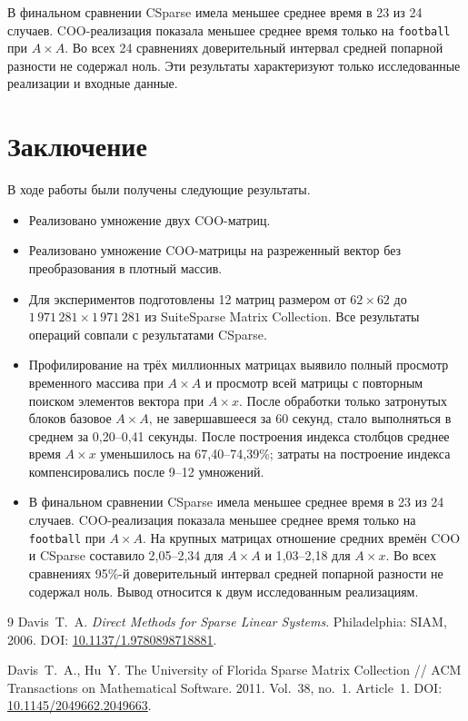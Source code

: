 \documentclass[a4paper]{article}
\begin{document}
В финальном сравнении CSparse имела меньшее среднее время в 23 из 24 случаев. COO-реализация показала меньшее среднее время только на \texttt{football} при $A\times A$. Во всех 24 сравнениях доверительный интервал средней попарной разности не содержал ноль. Эти результаты характеризуют только исследованные реализации и входные данные.

\section{Заключение}
В ходе работы были получены следующие результаты.
\begin{itemize}
\item Реализовано умножение двух COO-матриц.
\item Реализовано умножение COO-матрицы на разреженный вектор без преобразования в плотный массив.
\item Для экспериментов подготовлены 12 матриц размером от $62\times62$ до $1\,971\,281\times1\,971\,281$ из SuiteSparse Matrix Collection. Все результаты операций совпали с результатами CSparse.
\item Профилирование на трёх миллионных матрицах выявило полный просмотр временного массива при $A\times A$ и просмотр всей матрицы с повторным поиском элементов вектора при $A\times x$. После обработки только затронутых блоков базовое $A\times A$, не завершавшееся за 60 секунд, стало выполняться в среднем за 0{,}20--0{,}41 секунды. После построения индекса столбцов среднее время $A\times x$ уменьшилось на 67{,}40--74{,}39\%; затраты на построение индекса компенсировались после 9--12 умножений.
\item В финальном сравнении CSparse имела меньшее среднее время в 23 из 24 случаев. COO-реализация показала меньшее среднее время только на \texttt{football} при $A\times A$. На крупных матрицах отношение средних времён COO и CSparse составило 2{,}05--2{,}34 для $A\times A$ и 1{,}03--2{,}18 для $A\times x$. Во всех сравнениях 95\%-й доверительный интервал средней попарной разности не содержал ноль. Вывод относится к двум исследованным реализациям.
\end{itemize}

\begin{thebibliography}{9}
Davis~T.~A. \textit{Direct Methods for Sparse Linear Systems}. Philadelphia: SIAM, 2006. DOI: \href{https://doi.org/10.1137/1.9780898718881}{10.1137/1.9780898718881}.

Davis~T.~A., Hu~Y. The University of Florida Sparse Matrix Collection // ACM Transactions on Mathematical Software. 2011. Vol.~38, no.~1. Article~1. DOI: \href{https://doi.org/10.1145/2049662.2049663}{10.1145/2049662.2049663}.
\end{thebibliography}
\end{document}
